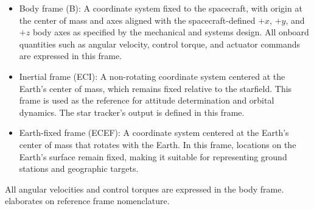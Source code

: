 \begin{itemize}
	\item Body frame (B): A coordinate system fixed to the spacecraft, with origin at the center of mass and axes aligned with the spacecraft-defined $+x$, $+y$, and $+z$ body axes as specified by the mechanical and systems design. All onboard quantities such as angular velocity, control torque, and actuator commands are expressed in this frame.
	\item Inertial frame (ECI): A non-rotating coordinate system centered at the Earth's center of mass, which remains fixed relative to the starfield. This frame is used as the reference for attitude determination and orbital dynamics. The star tracker's output is defined in this frame.
	\item Earth-fixed frame (ECEF): A coordinate system centered at the Earth's center of mass that rotates with the Earth. In this frame, locations on the Earth's surface remain fixed, making it suitable for representing ground stations and geographic targets. %
\end{itemize}

All angular velocities and control torques are expressed in the body frame.  elaborates on reference frame nomenclature.